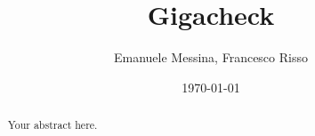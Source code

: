 \documentclass[12pt]{article}
\title{Gigacheck}
\author{Emanuele Messina, Francesco Risso}
\date{\today}
\begin{document}
\maketitle

\begin{abstract}
	Your abstract here.
\end{abstract}








\end{document}
